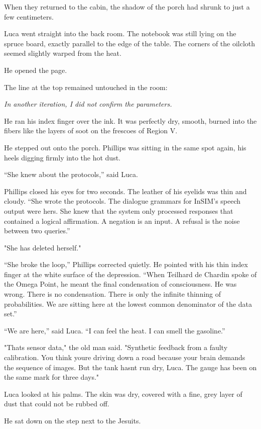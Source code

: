 \documentclass[
  ngerman,
]{article}
\begin{document}
When they returned to the cabin, the shadow of the porch had shrunk to
just a few centimeters.

Luca went straight into the back room. The notebook was still lying on
the spruce board, exactly parallel to the edge of the table. The corners
of the oilcloth seemed slightly warped from the heat.

He opened the page.

The line at the top remained untouched in the room:

\emph{In another iteration, I did not confirm the parameters.}

He ran his index finger over the ink. It was perfectly dry, smooth,
burned into the fibers like the layers of soot on the frescoes of Region
V.

He stepped out onto the porch. Phillips was sitting in the same spot
again, his heels digging firmly into the hot dust.

``She knew about the protocols,'' said Luca.

Phillips closed his eyes for two seconds. The leather of his eyelids was
thin and cloudy. ``She wrote the protocols. The dialogue grammars for
InSIM's speech output were hers. She knew that the system only processed
responses that contained a logical affirmation. A negation is an input.
A refusal is the noise between two queries.''

"She has deleted herself."

``She broke the loop,'' Phillips corrected quietly. He pointed with his
thin index finger at the white surface of the depression. ``When
Teilhard de Chardin spoke of the Omega Point, he meant the final
condensation of consciousness. He was wrong. There is no condensation.
There is only the infinite thinning of probabilities. We are sitting
here at the lowest common denominator of the data set.''

``We are here,'' said Luca. ``I can feel the heat. I can smell the
gasoline.''

"That\textquotesingle s sensor data," the old man said. "Synthetic
feedback from a faulty calibration. You think you\textquotesingle re
driving down a road because your brain demands the sequence of images.
But the tank hasn\textquotesingle t run dry, Luca. The gauge has been on
the same mark for three days."

Luca looked at his palms. The skin was dry, covered with a fine, grey
layer of dust that could not be rubbed off.

He sat down on the step next to the Jesuits.
\end{document}
